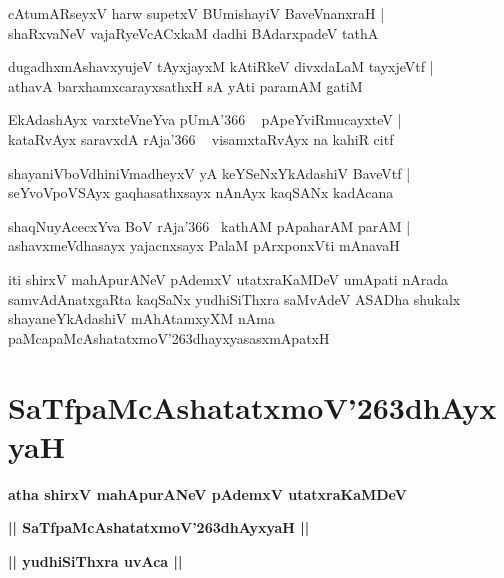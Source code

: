 \documentclass[twoside,12pt,openright]{book}
\def\S{\char'263}
\newcounter{shloka}[chapter]
\def\uvaca#1{\centerline{{\large\textbf{#1}}}}
\begin{document}
\begin{shloka}%
cAtumARseyxV harw supetxV BUmishayiV BaveVnanxraH |\\
shaRxvaNeV vajaRyeVcACxkaM dadhi BAdarxpadeV tathA 
\end{shloka}

\begin{shloka}%
dugadhxmAshavxyujeV tAyxjayxM kAtiRkeV divxdaLaM tayxjeVtf |\\
athavA barxhamxcarayxsathxH sA yAti paramAM gatiM
\end{shloka}

\begin{shloka}%
EkAdashAyx varxteVneYva pUmA\char'366 ~ pApeYviRmucayxteV |\\
kataRvAyx saravxdA rAja\char'366 ~ visamxtaRvAyx na kahiR citf
\end{shloka}

\begin{shloka}%
shayaniVboVdhiniVmadheyxV yA keYSeNxYkAdashiV BaveVtf |\\
seYvoVpoVSAyx gaqhasathxsayx nAnAyx kaqSANx kadAcana 
\end{shloka}

\begin{shloka}%
shaqNuyAcecxYva BoV rAja\char'366 ~kathAM pApaharAM parAM |\\
ashavxmeVdhasayx yajacnxsayx PalaM pArxponxVti mAnavaH 
\end{shloka}

\begin{center}
iti shirxV mahApurANeV pAdemxV utatxraKaMDeV umApati nArada samvAdAnatxgaRta kaqSaNx yudhiSiThxra 
saMvAdeV ASADha shukalx shayaneYkAdashiV mAhAtamxyXM nAma paMcapaMcAshatatxmoV\S dhayxyasasxmApatxH
\end{center}

\chapter{SaTfpaMcAshatatxmoV\S dhAyxyaH}

\begin{center}
{\LARGE\bfseries atha shirxV mahApurANeV pAdemxV utatxraKaMDeV}
\end{center}

\begin{center}
{\LARGE\bfseries || SaTfpaMcAshatatxmoV\S dhAyxyaH ||}
\end{center}

\uvaca{|| yudhiSiThxra uvAca ||}
\end{document}

